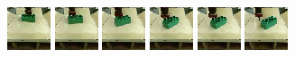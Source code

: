 \documentclass{article}
\begin{document}
\begin{figure}
\begin{subfigure}[b]{0.49\textwidth}
        \includegraphics[width=0.14\linewidth]{img/real_env_rollout_new/2/0.png}
        \includegraphics[width=0.14\linewidth]{img/real_env_rollout_new/2/1.png}
        \includegraphics[width=0.14\linewidth]{img/real_env_rollout_new/2/2.png}
        \includegraphics[width=0.14\linewidth]{img/real_env_rollout_new/2/3.png}
        \includegraphics[width=0.14\linewidth]{img/real_env_rollout_new/2/4.png}
        \hspace{0.01\linewidth}
        \includegraphics[width=0.14\linewidth]{img/real_env_rollout_new/2/goal.png}


\end{subfigure}
\end{figure}
\end{document}
